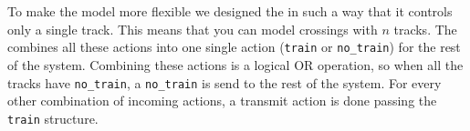 \documentclass[final]{report}
\begin{document}
\section{}
To make the model more flexible we designed the  in such a way that it controls only a single track.
This means that you can model crossings with $n$ tracks.
The  combines all these actions into one single action (\texttt{train} or \texttt{no\_train}) for the rest of the system.
Combining these actions is a logical OR operation, so when all the tracks have \texttt{no\_train}, a \texttt{no\_train} is send to the rest of the system.
For every other combination of incoming actions, a transmit action is done passing the \texttt{train} structure.
\end{document}
